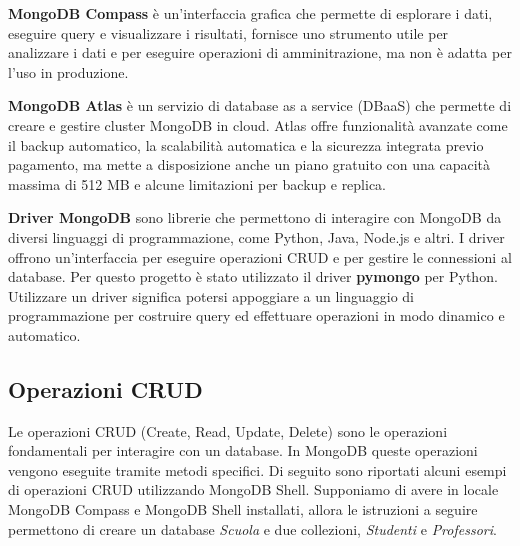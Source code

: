 \documentclass{article}
\begin{document}
\textbf{MongoDB Compass} è un'interfaccia grafica che permette di esplorare i dati, eseguire query e visualizzare i risultati,
fornisce uno strumento utile per analizzare i dati e per eseguire operazioni di amminitrazione, ma non è adatta per l'uso in produzione.

\textbf{MongoDB Atlas} è un servizio di database as a service (DBaaS) che permette di creare e gestire cluster MongoDB
in cloud. Atlas offre funzionalità avanzate come il backup automatico, la scalabilità automatica e la sicurezza integrata previo pagamento,
ma mette a disposizione anche un piano gratuito con una capacità massima di 512 MB e alcune limitazioni per backup e replica.

\textbf{Driver MongoDB} sono librerie che permettono di interagire con MongoDB da diversi linguaggi di programmazione,
 come Python, Java, Node.js e altri. I driver offrono un'interfaccia per eseguire operazioni CRUD e per gestire
  le connessioni al database. Per questo progetto è stato utilizzato il driver \textbf{pymongo} per Python. 
  Utilizzare un driver significa potersi appoggiare a un linguaggio di programmazione per costruire query ed effettuare operazioni
  in modo dinamico e automatico.

\subsection{Operazioni CRUD}

Le operazioni CRUD (Create, Read, Update, Delete) sono le operazioni fondamentali per interagire con un database. In
    MongoDB queste operazioni vengono eseguite tramite metodi specifici. Di seguito sono riportati alcuni esempi di operazioni CRUD
    utilizzando MongoDB Shell. Supponiamo di avere in locale MongoDB Compass e MongoDB Shell installati, allora le istruzioni a seguire
    permettono di creare un database \textit{Scuola} e due collezioni, \textit{Studenti} e \textit{Professori}.
\end{document}
